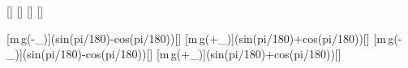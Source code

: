 [\mpss]
[\kg]
[\degree]
[\degree]

[m\,g\left(\sin\alpha-\mu_\cos\alpha\right)]{\mKiX*\gEX*(sin(\wiAX*pi/180)-\muHX*cos(\wiAX*pi/180))}[\newton]
[m\,g\left(\sin\alpha+\mu_\cos\alpha\right)]{\mKiX*\gEX*(sin(\wiAX*pi/180)+\muHX*cos(\wiAX*pi/180))}[\newton]
[m\,g\left(\sin\alpha-\mu_\cos\alpha\right)]{\mKiX*\gEX*(sin(\wiBX*pi/180)-\muHX*cos(\wiBX*pi/180))}[\newton]
[m\,g\left(\sin\alpha+\mu_\cos\alpha\right)]{\mKiX*\gEX*(sin(\wiBX*pi/180)+\muHX*cos(\wiBX*pi/180))}[\newton]
